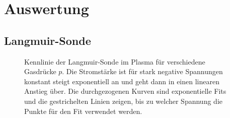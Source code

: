 \section{Auswertung}
\subsection{Langmuir-Sonde}\label{single}
\begin{figure}[htbp]
    \centering
    
    \caption{
        Kennlinie der Langmuir-Sonde im Plasma f\"ur verschiedene Gasdr\"ucke $p$.
        Die Stromst\"arke ist f\"ur stark negative Spannungen konstant steigt exponentiell an und geht dann in einen linearen Anstieg \"uber.
        Die durchgezogenen Kurven sind exponentielle Fits und die gestrichelten Linien zeigen, bis zu welcher Spannung die Punkte f\"ur den Fit verwendet werden.
        }
    \label{single_KL}
\end{figure}

